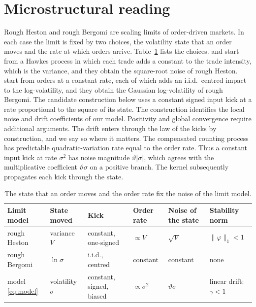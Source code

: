 \documentclass[11pt,a4paper]{article}
\theoremstyle{definition}
\begin{document}
\section{Microstructural reading}\label{sec:micro}

Rough Heston and rough Bergomi are scaling limits of order-driven markets. In each case the limit is fixed by two choices, the volatility state that an order moves and the rate at which orders arrive. Table~\ref{tab:kicks} lists the choices. \citet{JaissonRosenbaum2016} and \citet{ElEuchFukasawaRosenbaum2018} start from a Hawkes process in which each trade adds a constant to the trade intensity, which is the variance, and they obtain the square-root noise of rough Heston. \citet{HagerHorstWagenhoferXu2026} start from orders at a constant rate, each of which adds an i.i.d.\ centred impact to the log-volatility, and they obtain the Gaussian log-volatility of rough Bergomi. The candidate construction below uses a constant signed input kick at a rate proportional to the square of its state. The construction identifies the local noise and drift coefficients of our model. Positivity and global convergence require additional arguments. The drift enters through the law of the kicks by construction, and we say so where it matters. The compensated counting process has predictable quadratic-variation rate equal to the order rate. Thus a constant input kick at rate $\sigma^2$ has noise magnitude $\vartheta|\sigma|$, which agrees with the multiplicative coefficient $\vartheta\sigma$ on a positive branch. The kernel subsequently propagates each kick through the state.

\suppressfloats[t]
\begin{table}[ht]
\centering
\small
\caption{The state that an order moves and the order rate fix the noise of the limit model.}\label{tab:kicks}
\begin{tabular}{p{2.4cm}p{2.2cm}p{2.6cm}p{1.8cm}p{2.0cm}p{2.95cm}}
\toprule
Limit model & State moved & Kick & Order rate & Noise of the state & Stability norm \\
\midrule
rough Heston & variance $V$ & constant, one-signed & $\propto V$ & $\sqrt V$ & $\|\varphi\|_1<1$ \\
rough Bergomi & $\ln\sigma$ & i.i.d., centred & constant & constant & none \\
model \eqref{eq:model} & volatility $\sigma$ & constant, signed, biased & $\propto\sigma^2$ & $\vartheta\sigma$ & linear drift: $\gamma<1$ \\
\bottomrule
\end{tabular}
\end{table}
\end{document}
